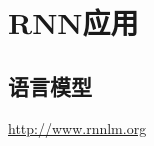\documentclass[UTF8,11pt,a4paper]{ctexart}
\begin{document}


\section{RNN应用}

\subsection{语言模型}
\href{Mikolov et al.}{http://www.rnnlm.org}
\end{document}
